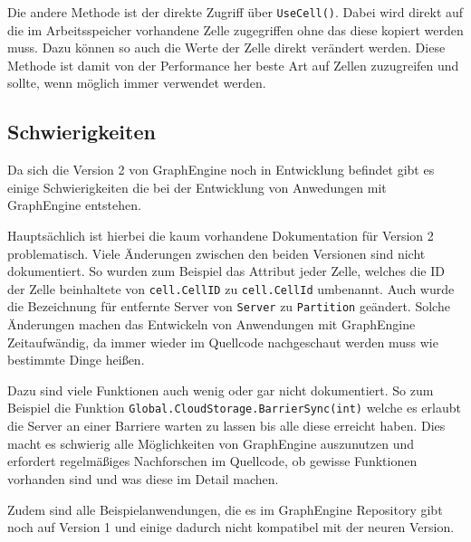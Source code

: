 Die andere Methode ist der direkte Zugriff über \verb|UseCell()|. Dabei wird direkt auf die im Arbeitsspeicher vorhandene Zelle zugegriffen ohne das diese kopiert werden muss. Dazu können so auch die Werte der Zelle direkt verändert werden. Diese Methode ist damit von der Performance her beste Art auf Zellen zuzugreifen und sollte, wenn möglich immer verwendet werden.



\subsection{Schwierigkeiten}

Da sich die Version 2 von GraphEngine noch in Entwicklung befindet gibt es einige Schwierigkeiten die bei der Entwicklung von Anwedungen mit GraphEngine entstehen.

Hauptsächlich ist hierbei die kaum vorhandene Dokumentation für Version 2 problematisch. Viele Änderungen zwischen den beiden Versionen sind nicht dokumentiert. So wurden zum Beispiel
das Attribut jeder Zelle, welches die ID der Zelle beinhaltete von \verb|cell.CellID| zu \verb|cell.CellId| umbenannt. Auch wurde die Bezeichnung für entfernte Server von \verb|Server| zu \verb|Partition| geändert.
Solche Änderungen machen das Entwickeln von Anwendungen mit GraphEngine Zeitaufwändig, da immer wieder im Quellcode nachgeschaut werden muss wie bestimmte Dinge heißen. 

Dazu sind viele Funktionen auch wenig oder gar nicht dokumentiert. So zum Beispiel die Funktion \verb|Global.CloudStorage.BarrierSync(int)| welche es erlaubt die Server an einer Barriere warten zu lassen bis alle diese erreicht haben.
Dies macht es schwierig alle Möglichkeiten von GraphEngine auszunutzen und erfordert regelmäßiges Nachforschen im Quellcode, ob gewisse Funktionen vorhanden sind und was diese im Detail machen.

Zudem sind alle Beispielanwendungen, die es im GraphEngine Repository gibt noch auf Version 1 und einige dadurch nicht kompatibel mit der neuren Version.


